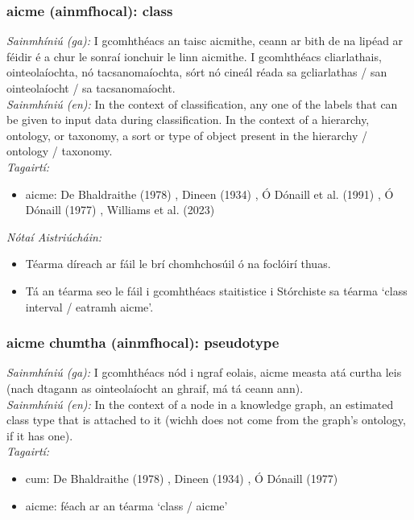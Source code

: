 \subsubsection*{aicme (ainmfhocal): class}
 \noindent \textit{Sainmhíniú (ga):} I gcomhthéacs an taisc aicmithe, ceann ar bith de na lipéad ar féidir é a chur le sonraí ionchuir le linn aicmithe. I gcomhthéacs cliarlathais, ointeolaíochta, nó tacsanomaíochta, sórt nó cineál réada sa gcliarlathas / san ointeolaíocht / sa tacsanomaíocht.
\\
 \noindent \textit{Sainmhíniú (en):} In the context of classification, any one of the labels that can be given to input data during classification. In the context of a hierarchy, ontology, or taxonomy, a sort or type of object present in the hierarchy / ontology / taxonomy.
\\
 \noindent \textit{Tagairtí:}
\begin{itemize}
	\item aicme: De Bhaldraithe (1978) \cite{de-bhaldraithe}, Dineen (1934) \cite{dineen}, Ó Dónaill et al. (1991) \cite{focloir-beag}, Ó Dónaill (1977) \cite{odonaill}, Williams et al. (2023) \cite{storchiste}
\end{itemize}

 \noindent \textit{Nótaí Aistriúcháin:}
\begin{itemize}
	\item Téarma díreach ar fáil le brí chomhchosúil ó na foclóirí thuas.
	\item Tá an téarma seo le fáil i gcomhthéacs staitistice i Stórchiste sa téarma `class interval / eatramh aicme'.
\end{itemize}


\subsubsection*{aicme chumtha (ainmfhocal): pseudotype}
 \noindent \textit{Sainmhíniú (ga):} I gcomhthéacs nód i ngraf eolais, aicme measta atá curtha leis (nach dtagann as ointeolaíocht an ghraif, má tá ceann ann).
\\
 \noindent \textit{Sainmhíniú (en):} In the context of a node in a knowledge graph, an estimated class type that is attached to it (wichh does not come from the graph's ontology, if it has one).
\\
 \noindent \textit{Tagairtí:}
\begin{itemize}
	\item cum: De Bhaldraithe (1978) \cite{de-bhaldraithe}, Dineen (1934) \cite{dineen}, Ó Dónaill (1977) \cite{odonaill}
	\item aicme: féach ar an téarma `class / aicme'
\end{itemize}

